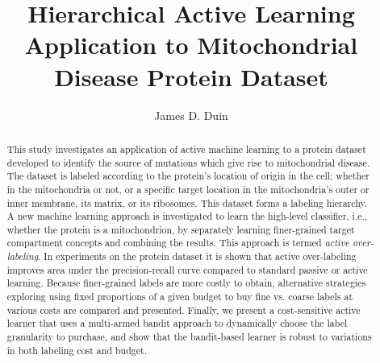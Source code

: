 \documentclass[ms]{nuthesis}
\begin{document}
\frontmatter

\title{Hierarchical Active Learning Application to Mitochondrial Disease Protein Dataset}
\author{James D. Duin}
\maketitle
\begin{abstract}
This study investigates an application of active machine learning to
a protein dataset developed to identify the source of mutations
which give rise to mitochondrial disease.
The dataset is labeled according to the protein's location of origin
in the cell; whether in the mitochondria or not, or a specific target
location in the mitochondria's outer or inner membrane, its matrix, or its ribosomes. This dataset
 forms a labeling hierarchy.
 A new machine learning approach is investigated to learn the
 high-level classifier, i.e.,
 whether the protein is a mitochondrion, by separately learning
 finer-grained target compartment concepts and combining the results. This
 approach is termed \textit{active over-labeling}.
 In experiments on the protein dataset it is shown that
 active over-labeling improves area under the precision-recall curve
 compared to standard passive or active learning.
 Because finer-grained labels are more costly to obtain, alternative
 strategies exploring using fixed proportions of a given budget to buy
  fine vs. coarse labels at various costs are compared and presented.
  Finally, we present a cost-sensitive active learner that uses
  a multi-armed bandit approach to dynamically choose the label
  granularity to purchase, and show that the bandit-based learner is
  robust to variations in both labeling cost and budget.
\end{abstract}
\end{document}
